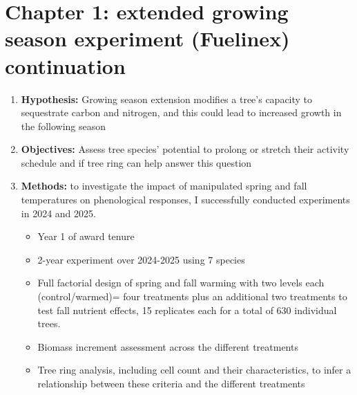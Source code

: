 \documentclass{article}
\begin{document}
\section*{Chapter 1: extended growing season experiment (Fuelinex) continuation}
\begin {enumerate}
	\item \textbf{Hypothesis:} Growing season extension modifies a tree’s capacity to sequestrate carbon and nitrogen, and this could lead to increased growth in the following season \citep{chapin_ecology_1990,landhausser_partitioning_2012,lawrence_variable_2018,martens_first-year_2007,schott_premature_2013}
	\item \textbf{Objectives:} Assess tree species’ potential to prolong or stretch their activity schedule and if tree ring can help answer this question
	\item \textbf{Methods:} to investigate the impact of manipulated spring and fall temperatures on phenological responses, I successfully conducted experiments in 2024 and 2025.
	\begin{itemize}
			\item Year 1 of award tenure
			\item 2-year experiment over 2024-2025 using 7 species
			\item Full factorial design of spring and fall warming with two levels each (control/warmed)= four treatments plus an additional two treatments to test fall nutrient effects, 15 replicates each for a total of 630 individual trees.
			\item Biomass increment assessment across the different treatments
			\item Tree ring analysis, including cell count and their characteristics, to infer a relationship between these criteria and the different treatments
		\end{itemize}
\end {enumerate}
\end{document}
